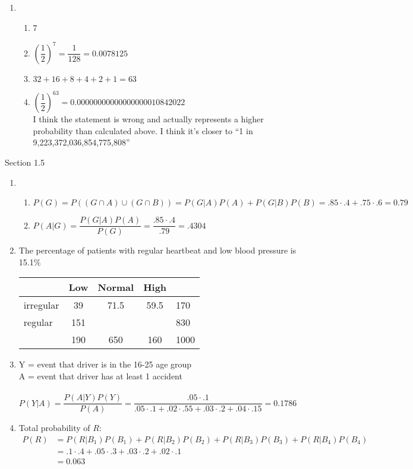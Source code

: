 \documentclass{article}
\begin{document}
\begin{enumerate}
      \item 
	\begin{enumerate}
	 \item 7
	 \item $\left(\dfrac{1}{2}\right)^7 = \dfrac{1}{128} = 0.0078125$
	 \item $32 + 16 + 8 + 4 + 2 + 1 = 63$
	 \item $\left(\dfrac{1}{2}\right)^{63} = 0.00000000000000000010842022$ \\
	 I think the statement is wrong and actually represents a higher probability than calculated
	 above. I think it's closer to ``1 in 9,223,372,036,854,775,808''
	\end{enumerate}	
    \end{enumerate}
    
    Section 1.5
    \begin{enumerate}
     \addtocounter{enumi}{1}
     
     \item 
      \begin{enumerate}
       \item $P(G) = P((G \cap A) \cup (G \cap B)) = P(G|A)P(A) + P(G|B)P(B) 
       = .85\cdot.4 + .75\cdot.6 = 0.79$
       \item $P(A|G) = \dfrac{P(G|A)P(A)}{P(G)} = \dfrac{.85\cdot.4}{.79} = .4304$
      \end{enumerate}
      
     \item 
	The percentage of patients with regular heartbeat and low blood pressure is 15.1\%
	\begin{longtable}[c]{@{}lcccl@{}}
	  \toprule
	  & Low & Normal & High\tabularnewline
	  \midrule
	  \endhead
	  irregular & 39 & 71.5 & 59.5 & 170\tabularnewline
	  regular & 151 & & & 830\tabularnewline
	  & 190 & 650 & 160 & 1000 \tabularnewline
	  \bottomrule
	\end{longtable}
	
     \item 
	Y = event that driver is in the 16-25 age group \\
	A = event that driver has at least 1 accident \\
	\\
	$P(Y|A) = \dfrac{P(A|Y)P(Y)}{P(A)} = \dfrac{.05\cdot.1}{.05\cdot.1 + .02\cdot.55 + 
	  .03\cdot.2 + .04\cdot.15} = 0.1786$
     \addtocounter{enumi}{3}
      
     \item 
	Total probability of $R$:
	\begin{align*}
	  P(R) &= P(R|B_1)P(B_1)+P(R|B_2)P(B_2)+P(R|B_3)P(B_3)+P(R|B_4)P(B_4) \\
	       &= .1\cdot.4 + .05\cdot.3 + .03\cdot.2 + .02\cdot.1 \\
	       &= 0.063
	\end{align*}
	\newline
	

\end{enumerate}
\end{document}
